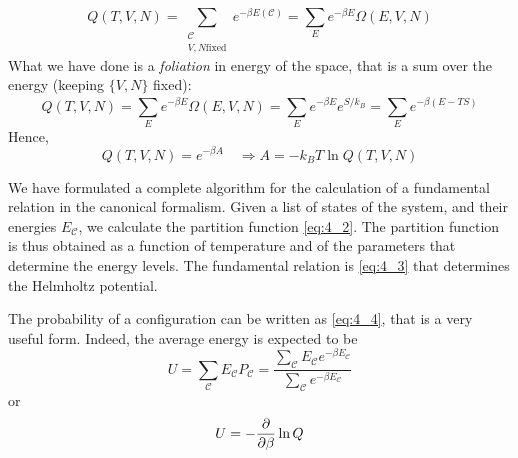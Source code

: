 \documentclass[../main/main.tex]{subfiles}
\begin{document}
\begin{remark}
\begin{equation*}
  Q(T,V,N) = \sum_{\substack{ \mathcal{C} \\ V,N \text{fixed} }} e^{-\beta E (\mathcal{C})} = \sum_{E}^{} e^{-\beta E} \Omega (E,V,N)
\end{equation*}
What we have done is a \emph{foliation} in energy of the space, that is a sum over the energy (keeping \( \{V,N\} \) fixed):
\begin{equation*}
  Q(T,V,N) = \sum_{E}^{} e^{-\beta E} \Omega (E,V,N) = \sum_{E}^{} e^{-\beta E} e^{S/k_B} = \sum_{E}^{} e^{-\beta (E-T S)}
\end{equation*}
Hence,
\begin{equation*}
  Q(T,V,N) = e^{-\beta A} \quad \Rightarrow A = - k_B T \ln{Q(T,V,N)}
\end{equation*}
\end{remark}

We have formulated a complete algorithm for the calculation of a fundamental relation in the canonical formalism. Given a list of states of the system, and their energies \( E_ {\mathcal{C}} \), we calculate the partition function \eqref{eq:4_2}. The partition function is thus obtained as a function of temperature and of the parameters that determine the energy levels. The fundamental relation is \eqref{eq:4_3} that determines the Helmholtz potential.

The probability of a configuration can be written as \eqref{eq:4_4}, that is a very useful form. Indeed, the average energy is expected to be
\begin{equation}
  U = \sum_{\mathcal{C}}^{} E_ {\mathcal{C}} P_{\mathcal{C}}  = \frac{ \sum_{\mathcal{C}}^{} E_ {\mathcal{C}} e^{-\beta E_ \mathcal{C}}}{\sum_{\mathcal{C}}^{} e^{-\beta E_ \mathcal{C}} }
\end{equation}
or
\begin{equation}
  U =  -\pdv{}{\beta } \ln{Q}
\end{equation}
\end{document}
